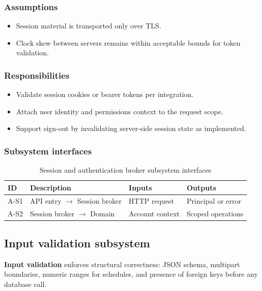 \subsubsection{Assumptions}
\begin{itemize}
  \item Session material is transported only over TLS.
  \item Clock skew between servers remains within acceptable bounds for token validation.
\end{itemize}

\subsubsection{Responsibilities}
\begin{itemize}
  \item Validate session cookies or bearer tokens per integration.
  \item Attach user identity and permissions context to the request scope.
  \item Support sign-out by invalidating server-side session state as implemented.
\end{itemize}

\subsubsection{Subsystem interfaces}
\begin{table}[H]
\centering
\small
\begin{tabular}{|p{0.9cm}|p{3.4cm}|p{3.0cm}|p{3.5cm}|}
\hline
\textbf{ID} & \textbf{Description} & \textbf{Inputs} & \textbf{Outputs} \\
\hline
A-S1 & API entry $\rightarrow$ Session broker & HTTP request & Principal or error \\
\hline
A-S2 & Session broker $\rightarrow$ Domain & Account context & Scoped operations \\
\hline
\end{tabular}
\caption{Session and authentication broker subsystem interfaces}
\end{table}

\subsection{Input validation subsystem}

\textbf{Input validation} enforces structural correctness: JSON schema, multipart boundaries, numeric ranges for schedules, and presence of foreign keys before any database call.

